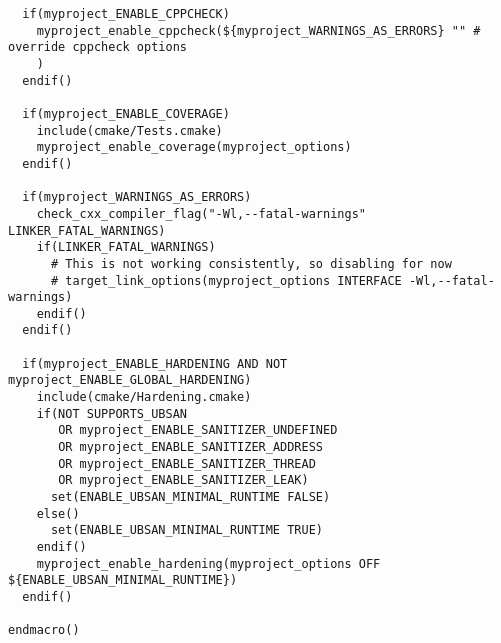 \begin{verbatim}
  if(myproject_ENABLE_CPPCHECK)
    myproject_enable_cppcheck(${myproject_WARNINGS_AS_ERRORS} "" # override cppcheck options
    )
  endif()

  if(myproject_ENABLE_COVERAGE)
    include(cmake/Tests.cmake)
    myproject_enable_coverage(myproject_options)
  endif()

  if(myproject_WARNINGS_AS_ERRORS)
    check_cxx_compiler_flag("-Wl,--fatal-warnings" LINKER_FATAL_WARNINGS)
    if(LINKER_FATAL_WARNINGS)
      # This is not working consistently, so disabling for now
      # target_link_options(myproject_options INTERFACE -Wl,--fatal-warnings)
    endif()
  endif()

  if(myproject_ENABLE_HARDENING AND NOT myproject_ENABLE_GLOBAL_HARDENING)
    include(cmake/Hardening.cmake)
    if(NOT SUPPORTS_UBSAN 
       OR myproject_ENABLE_SANITIZER_UNDEFINED
       OR myproject_ENABLE_SANITIZER_ADDRESS
       OR myproject_ENABLE_SANITIZER_THREAD
       OR myproject_ENABLE_SANITIZER_LEAK)
      set(ENABLE_UBSAN_MINIMAL_RUNTIME FALSE)
    else()
      set(ENABLE_UBSAN_MINIMAL_RUNTIME TRUE)
    endif()
    myproject_enable_hardening(myproject_options OFF ${ENABLE_UBSAN_MINIMAL_RUNTIME})
  endif()

endmacro()
\end{verbatim}









